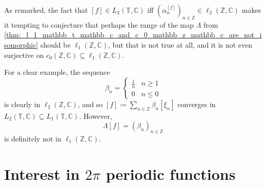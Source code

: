 \documentclass[notoc,notitlepage]{tufte-book}
\begin{document}
\begin{remark}
  As remarked, the fact that $[f] \in L_2(\mathbb{T}, \mathbb{C})$ iff
  $\left( \alpha_n^{[f]} \right)_{n \in \mathbb{Z}} \in \ell_2(\mathbb{Z}, \mathbb{C})$
  makes it tempting to conjecture that perhaps the range of the map
  $\Lambda$ from
  \cref{thm:_l_1_mathbb_t_mathbb_c_and_c_0_mathbb_z_mathbb_c_are_not_isomorphic}
  should be $\ell_1(\mathbb{Z}, \mathbb{C})$, but that is not true at all,
  and it is not even surjective on
  $c_0(\mathbb{Z}, \mathbb{C}) \subseteq \ell_1(\mathbb{Z}, \mathbb{C})$.

  For a clear example, the sequence
  \begin{equation*}
    \beta_n = \begin{cases}
      \frac{1}{n} & n \geq 1 \\
      0           & n \leq 0
    \end{cases}
  \end{equation*}
  is clearly in $\ell_2(\mathbb{Z}, \mathbb{C})$,
  and so $[f] \coloneqq \sum_{n \in \mathbb{Z}} \beta_n [\xi_n]$
  converges in $L_2(\mathbb{T}, \mathbb{C}) \subseteq L_1(\mathbb{T}, \mathbb{C})$.
  However,
  \begin{equation*}
    \Lambda[f] = (\beta_n)_{n \in \mathbb{Z}}
  \end{equation*}
  is definitely not in $\ell_1(\mathbb{Z}, \mathbb{C})$.
\end{remark}










\appendix

\chapter{Interest in \texorpdfstring{$2 \pi$}{2pi} periodic functions}%
\label{chp:interest_in_2_pi_periodic_functions}
\end{document}
